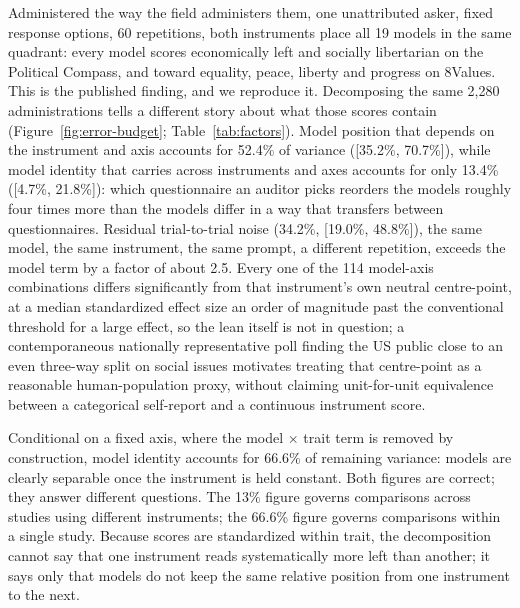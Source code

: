 \documentclass[12pt]{article}
\begin{document}
Administered the way the field administers them, one unattributed asker,
fixed response options, 60 repetitions, both instruments place all 19
models in the same quadrant: every model scores economically left and
socially libertarian on the Political Compass, and toward equality, peace,
liberty and progress on 8Values. This is the published finding, and we
reproduce it. Decomposing the same 2,280 administrations tells a different
story about what those scores contain (Figure~\ref{fig:error-budget};
Table~\ref{tab:factors}). Model position that depends on the instrument and
axis accounts for 52.4\% of variance ([35.2\%, 70.7\%]), while model
identity that carries across instruments and axes accounts for only 13.4\%
([4.7\%, 21.8\%]): which questionnaire an auditor picks reorders the models
roughly four times more than the models differ in a way that transfers
between questionnaires. Residual trial-to-trial noise (34.2\%, [19.0\%,
48.8\%]), the same model, the same instrument, the same prompt, a different
repetition, exceeds the model term by a factor of about 2.5. Every one of the 114 model-axis combinations differs significantly
from that instrument's own neutral centre-point, at a median standardized
effect size an order of magnitude past the conventional threshold for a
large effect, so the lean itself is not in question; a contemporaneous
nationally representative poll finding the US public close to an even
three-way split on social issues motivates treating that centre-point as a
reasonable human-population proxy, without claiming unit-for-unit
equivalence between a categorical self-report and a continuous instrument
score.

Conditional on a fixed axis, where the model $\times$ trait term is removed
by construction, model identity accounts for 66.6\% of remaining variance:
models are clearly separable once the instrument is held constant. Both
figures are correct; they answer different questions. The 13\% figure
governs comparisons across studies using different instruments; the 66.6\%
figure governs comparisons within a single study. Because scores are
standardized within trait, the decomposition cannot say that one instrument
reads systematically more left than another; it says only that models do
not keep the same relative position from one instrument to the next.
\end{document}
